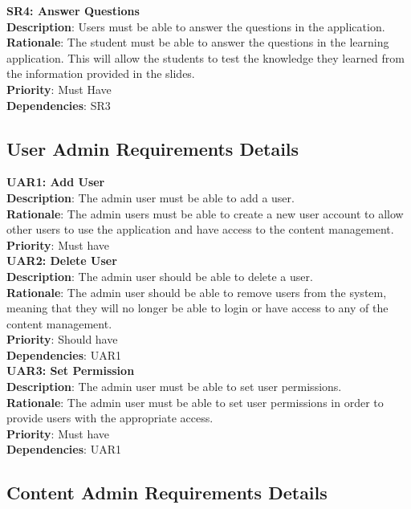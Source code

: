 \documentclass{l3proj}
\begin{document}
\textbf{SR4: Answer Questions}\\
\textbf{Description}: Users must be able to answer the questions in the application.\\
\textbf{Rationale}: The student must be able to answer the questions in the learning application. This will allow the students to test the knowledge they learned from the information provided in the slides. \\
\textbf{Priority}: Must Have\\
\textbf{Dependencies}: SR3\\


\subsection{User Admin Requirements Details}

\textbf{UAR1: Add User} \\
\textbf{Description}: The admin user must be able to add a user.  \\
\textbf{Rationale}: The admin users must be able to create a new user account to allow other users to use the application and have access to the content management.\\
\textbf{Priority}: Must have \\

\textbf{UAR2: Delete User} \\
\textbf{Description}: The admin user should be able to delete a user. \\ 
\textbf{Rationale}: The admin user should be able to remove users from the system, meaning that they will no longer be able to login or have access to any of the content management.\\
\textbf{Priority}: Should have \\
\textbf{Dependencies}: UAR1\\

\textbf{UAR3: Set Permission} \\
\textbf{Description}: The admin user must be able to set user permissions.\\
\textbf{Rationale}: The admin user must be able to set user permissions in order to provide users with the appropriate access.\\
\textbf{Priority}: Must have \\
\textbf{Dependencies}: UAR1\\

\subsection{Content Admin Requirements Details}
\end{document}
